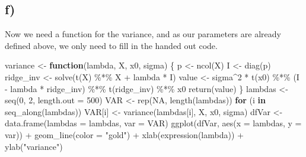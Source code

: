 \documentclass[
]{article}
\newenvironment{Shaded}{\begin{snugshade}}{\end{snugshade}}
\newcommand{\AttributeTok}[1]{\textcolor[rgb]{0.77,0.63,0.00}{#1}}
\newcommand{\ConstantTok}[1]{\textcolor[rgb]{0.00,0.00,0.00}{#1}}
\newcommand{\ControlFlowTok}[1]{\textcolor[rgb]{0.13,0.29,0.53}{\textbf{#1}}}
\newcommand{\DecValTok}[1]{\textcolor[rgb]{0.00,0.00,0.81}{#1}}
\newcommand{\FunctionTok}[1]{\textcolor[rgb]{0.00,0.00,0.00}{#1}}
\newcommand{\NormalTok}[1]{#1}
\newcommand{\OtherTok}[1]{\textcolor[rgb]{0.56,0.35,0.01}{#1}}
\newcommand{\SpecialCharTok}[1]{\textcolor[rgb]{0.00,0.00,0.00}{#1}}
\newcommand{\StringTok}[1]{\textcolor[rgb]{0.31,0.60,0.02}{#1}}
\begin{document}
\hypertarget{f}{%
\subsection{f)}\label{f}}

Now we need a function for the variance, and as our parameters are
already defined above, we only need to fill in the handed out code.

\begin{Shaded}
\begin{Highlighting}[]
\NormalTok{variance }\OtherTok{\textless{}{-}} \ControlFlowTok{function}\NormalTok{(lambda, X, x0, sigma) \{}
\NormalTok{    p }\OtherTok{\textless{}{-}} \FunctionTok{ncol}\NormalTok{(X)}
\NormalTok{    I }\OtherTok{\textless{}{-}} \FunctionTok{diag}\NormalTok{(p)}
\NormalTok{    ridge\_inv }\OtherTok{\textless{}{-}} \FunctionTok{solve}\NormalTok{(}\FunctionTok{t}\NormalTok{(X) }\SpecialCharTok{\%*\%}\NormalTok{ X }\SpecialCharTok{+}\NormalTok{ lambda }\SpecialCharTok{*}\NormalTok{ I)}
\NormalTok{    value }\OtherTok{\textless{}{-}}\NormalTok{ sigma}\SpecialCharTok{\^{}}\DecValTok{2} \SpecialCharTok{*} \FunctionTok{t}\NormalTok{(x0) }\SpecialCharTok{\%*\%}\NormalTok{ (I }\SpecialCharTok{{-}}\NormalTok{ lambda }\SpecialCharTok{*}\NormalTok{ ridge\_inv) }\SpecialCharTok{\%*\%} \FunctionTok{t}\NormalTok{(ridge\_inv) }\SpecialCharTok{\%*\%}\NormalTok{ x0}
    \FunctionTok{return}\NormalTok{(value)}
\NormalTok{\}}
\NormalTok{lambdas }\OtherTok{\textless{}{-}} \FunctionTok{seq}\NormalTok{(}\DecValTok{0}\NormalTok{, }\DecValTok{2}\NormalTok{, }\AttributeTok{length.out =} \DecValTok{500}\NormalTok{)}
\NormalTok{VAR }\OtherTok{\textless{}{-}} \FunctionTok{rep}\NormalTok{(}\ConstantTok{NA}\NormalTok{, }\FunctionTok{length}\NormalTok{(lambdas))}
\ControlFlowTok{for}\NormalTok{ (i }\ControlFlowTok{in} \FunctionTok{seq\_along}\NormalTok{(lambdas)) VAR[i] }\OtherTok{\textless{}{-}} \FunctionTok{variance}\NormalTok{(lambdas[i], X, x0, sigma)}
\NormalTok{dfVar }\OtherTok{\textless{}{-}} \FunctionTok{data.frame}\NormalTok{(}\AttributeTok{lambdas =}\NormalTok{ lambdas, }\AttributeTok{var =}\NormalTok{ VAR)}
\FunctionTok{ggplot}\NormalTok{(dfVar, }\FunctionTok{aes}\NormalTok{(}\AttributeTok{x =}\NormalTok{ lambdas, }\AttributeTok{y =}\NormalTok{ var)) }\SpecialCharTok{+} \FunctionTok{geom\_line}\NormalTok{(}\AttributeTok{color =} \StringTok{"gold"}\NormalTok{) }\SpecialCharTok{+} \FunctionTok{xlab}\NormalTok{(}\FunctionTok{expression}\NormalTok{(lambda)) }\SpecialCharTok{+}
    \FunctionTok{ylab}\NormalTok{(}\StringTok{"variance"}\NormalTok{)}
\end{Highlighting}
\end{Shaded}
\end{document}
